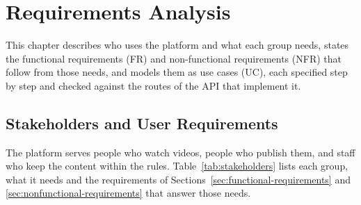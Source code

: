 \chapter{Requirements Analysis}
\label{chap:requirements}

This chapter describes who uses the platform and what each group needs, states the
functional requirements (FR) and non-functional requirements (NFR) that follow from those needs, and models them as use cases (UC), each
specified step by step and checked against the routes of the API that implement it.

\section{Stakeholders and User Requirements}
\label{sec:stakeholders}

The platform serves people who watch videos, people who publish them, and staff who keep the
content within the rules. Table~\ref{tab:stakeholders} lists each group, what it needs and the
requirements of Sections~\ref{sec:functional-requirements} and \ref{sec:nonfunctional-requirements}
that answer those needs.

